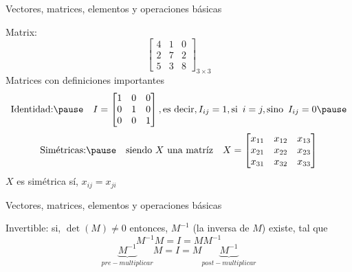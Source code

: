 \documentclass[aspectratio=169]{beamer}
\begin{document}
\begin{frame}
 {Vectores, matrices, elementos y operaciones b\'asicas}

{ \color{black}
Matrix:
\begin{equation*}
  \begin{bmatrix}
   4 & 1 & 0 \\
   2 & 7 & 2 \\
   5 & 3 & 8 
  \end{bmatrix}_{3\times3}
 \end{equation*}
 \pause
Matrices con definiciones importantes 
\vskip -0.2cm
 \begin{equation*}
 \textnormal{Identidad:} \pause \quad I = \begin{bmatrix}
   1 & 0 & 0 \\
   0 & 1 & 0 \\
   0 & 0 & 1 
  \end{bmatrix}, \textnormal{es decir}, I_{ij} = 1, \textnormal{si \,} i = j, \textnormal{sino \,} I_{ij} = 0 \pause 
 \end{equation*} \pause
 \begin{equation*}
     \textnormal{Sim\'etricas:} \pause \quad \textnormal{siendo $X$ una matríz}\quad X = \begin{bmatrix}
   x_{11} & x_{12} & x_{13} \\
   x_{21} & x_{22} & x_{23} \\
   x_{31} & x_{32} & x_{33} 
  \end{bmatrix} 
 \end{equation*}
 $X$ es simétrica sí, $x_{ij} = x_{ji}$
}

\end{frame}


\begin{frame}
 {Vectores, matrices, elementos y operaciones b\'asicas}

{ \color{black}
 Invertible: \pause \quad si, \quad $\det(M) \neq 0$ \quad entonces, \quad $M^{-1}$ (la inversa de $M$) existe, tal que 
 \begin{equation*}
  M^{-1}M = I = MM^{-1}
 \end{equation*}
 \pause \vskip -1.4cm
 \begin{equation*}
  \underbrace{M^{-1}}_{pre-multiplicar}M = I = M\underbrace{M^{-1}}_{post-multiplicar}
 \end{equation*}
}
 
\end{frame}
\end{document}
